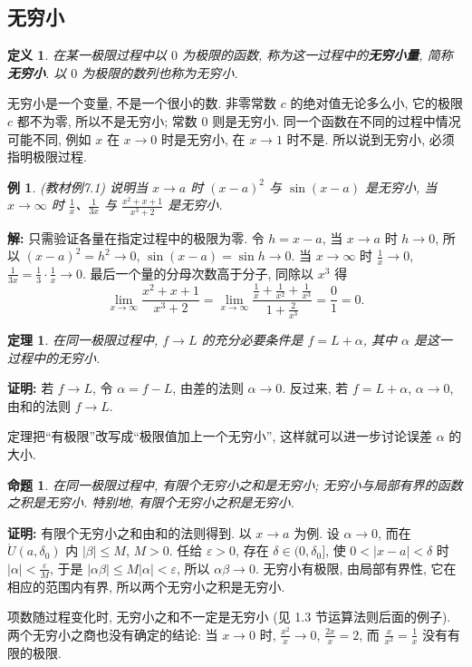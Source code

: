 \documentclass[UTF8,openany]{ctexbook}
\theoremstyle{chinesetextbook}
\newtheorem{definition}{定义}[section]
\newtheorem{example}{例}[section]
\newtheorem{proposition}{命题}[section]
\newenvironment{cnproof}{\par\indent\textbf{证明:} \ignorespaces}{\par}
\newenvironment{cnsolution}{\par\indent\textbf{解:} \ignorespaces}{\par}
\newtheorem*{theoremsingle}{定理}
\begin{document}
\subsection{无穷小}
\begin{definition}
在某一极限过程中以 $0$ 为极限的函数, 称为这一过程中的\textbf{无穷小量}, 简称\textbf{无穷小}. 以 $0$ 为极限的数列也称为无穷小.
\end{definition}
无穷小是一个变量, 不是一个很小的数. 非零常数 $c$ 的绝对值无论多么小, 它的极限 $c$ 都不为零, 所以不是无穷小; 常数 $0$ 则是无穷小. 同一个函数在不同的过程中情况可能不同, 例如 $x$ 在 $x\to0$ 时是无穷小, 在 $x\to1$ 时不是. 所以说到无穷小, 必须指明极限过程.
\begin{example}
\textnormal{(教材例7.1)} 说明当 $x\to a$ 时 $(x-a)^2$ 与 $\sin(x-a)$ 是无穷小, 当 $x\to\infty$ 时 $\displaystyle\frac1x$、$\displaystyle\frac1{3x}$ 与 $\displaystyle\frac{x^2+x+1}{x^3+2}$ 是无穷小.
\end{example}
\begin{cnsolution}
只需验证各量在指定过程中的极限为零. 令 $h=x-a$, 当 $x\to a$ 时 $h\to0$, 所以 $(x-a)^2=h^2\to0$, $\sin(x-a)=\sin h\to0$. 当 $x\to\infty$ 时 $\displaystyle\frac1x\to0$, $\displaystyle\frac1{3x}=\frac13\cdot\frac1x\to0$. 最后一个量的分母次数高于分子, 同除以 $x^3$ 得
\[
\lim_{x\to\infty}\frac{x^2+x+1}{x^3+2}=\lim_{x\to\infty}\frac{\frac1x+\frac1{x^2}+\frac1{x^3}}{1+\frac2{x^3}}=\frac01=0.
\]
\end{cnsolution}
\begin{theoremsingle}
在同一极限过程中, $f\to L$ 的充分必要条件是 $f=L+\alpha$, 其中 $\alpha$ 是这一过程中的无穷小.
\end{theoremsingle}
\begin{cnproof}
若 $f\to L$, 令 $\alpha=f-L$, 由差的法则 $\alpha\to0$. 反过来, 若 $f=L+\alpha$, $\alpha\to0$, 由和的法则 $f\to L$.
\end{cnproof}
定理把“有极限”改写成“极限值加上一个无穷小”, 这样就可以进一步讨论误差 $\alpha$ 的大小.
\begin{proposition}
在同一极限过程中, 有限个无穷小之和是无穷小; 无穷小与局部有界的函数之积是无穷小. 特别地, 有限个无穷小之积是无穷小.
\end{proposition}
\begin{cnproof}
有限个无穷小之和由和的法则得到. 以 $x\to a$ 为例. 设 $\alpha\to0$, 而在 $\mathring U(a,\delta_0)$ 内 $|\beta|\le M$, $M>0$. 任给 $\varepsilon>0$, 存在 $\delta\in(0,\delta_0]$, 使 $0<|x-a|<\delta$ 时 $\displaystyle|\alpha|<\frac\varepsilon M$, 于是 $|\alpha\beta|\le M|\alpha|<\varepsilon$, 所以 $\alpha\beta\to0$. 无穷小有极限, 由局部有界性, 它在相应的范围内有界, 所以两个无穷小之积是无穷小.
\end{cnproof}
项数随过程变化时, 无穷小之和不一定是无穷小 (见 1.3 节运算法则后面的例子). 两个无穷小之商也没有确定的结论: 当 $x\to0$ 时, $\displaystyle\frac{x^2}x\to0$, $\displaystyle\frac{2x}x=2$, 而 $\displaystyle\frac x{x^2}=\frac1x$ 没有有限的极限.
\end{document}
